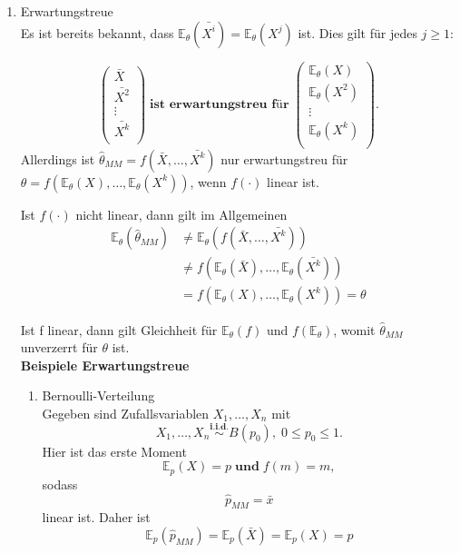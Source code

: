 \documentclass[10pt]{article}
\newcommand{\FZV}{X_1, \ldots, X_n} %
\newcommand{\EW}{\mathbb{E}} %
\begin{document}
\begin{enumerate}
	\item Erwartungstreue\\
	Es ist bereits bekannt, dass $\EW_\theta(\bar{X^i})=\EW_\theta(X^j)$ ist. Dies gilt für jedes $j \geq 1$:
	
	\begin{equation*}
		\left(
		\begin{array}{c}
			\bar{X}\\
			\bar{X^2}\\
			\vdots\\
			\bar{X^k}\\
		\end{array}
		\right)\; \textbf{ist erwartungstreu für} \;
		\left(
		\begin{array}{c}
		 \EW_\theta(X)\\
		 \EW_\theta(X^2)\\
			\vdots\\
		 \EW_\theta(X^k) \\
		\end{array}
		\right).
	\end{equation*}
	 Allerdings ist $\hat{\theta}_{MM} = f(\bar{X}, \ldots, \bar{X^k})$ nur erwartungstreu für $\theta = f(\EW_\theta(X), \ldots, \EW_\theta(X^k))$, wenn $f(\cdot)$ linear ist. 
	 
	 Ist $f(\cdot)$ nicht linear, dann gilt im Allgemeinen
	 \begin{equation*}
	 	\begin{split}
	 	\EW_\theta(\hat{\theta}_{MM}) &\neq \EW_\theta(f(\bar{X}, \ldots, \bar{X^k}))\\
	 	&\neq f(\EW_\theta(\bar{X}),\ldots, \EW_\theta(\bar{X^k}))\\
	 	&= f(\EW_\theta({X}),\ldots, \EW_\theta({X^k})) =  \theta
	 \end{split}
	 \end{equation*}
	
	Ist f linear, dann gilt Gleichheit für $\EW_{\theta}(f)$ und $f(\EW_{\theta})$, womit $\hat{\theta}_{MM}$ unverzerrt für $\theta$ ist.\\
	
	\textbf{Beispiele Erwartungstreue}

	\begin{enumerate}[label = (\roman*)]
		\item Bernoulli-Verteilung\\
			Gegeben sind Zufallsvariablen $\FZV$ mit
		\begin{equation*}
			\FZV \overset{\textbf{i.i.d.}}{\sim} B(p_0), \; 0 \leq p_0 \leq 1.
		\end{equation*} 
		Hier ist das erste Moment
		\begin{equation*}
			\EW_p(X)=p \; \textbf{und} \; 	f(m)=m,
		\end{equation*}
		sodass
		\begin{equation*}
			\hat{p}_{MM} = \bar{x} 
		\end{equation*}
		linear ist. Daher ist 
		\begin{equation*}
			\EW_p(\hat{p}_{MM}) = \EW_p(\bar{X}) = \EW_p(X) = p
		\end{equation*}
		

\end{enumerate}
\end{enumerate}
\end{document}
